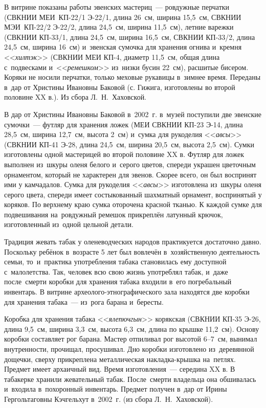 В витрине показаны работы эвенских мастериц~--- ровдужные перчатки (СВКНИИ МЕИ~КП-22/1 Э-22/1, длина 26~см, ширина 15,5~см, СВКНИИ МЭИ~КП-22/2 Э-22/2, длина 24,5~см, ширина 11,5~см), летние варежки (СВКНИИ КП-33/1, длина 24,5~см, ширина 16,5~см, СВКНИИ КП-33/2, длина 24,5~см, ширина 16~см) и~эвенская сумочка для хранения огнива и~кремня <<\textit{хилтэк}>> (СВКНИИ МЕИ КП-4, диаметр 11,5~см, общая длина с~подвесками и~<<\textit{ремешком}>> из~низки бусин 22~см), расшитые бисером. Коряки не носили перчатки, только меховые рукавицы в~зимнее время. Переданы в~дар от Христины Ивановны Баковой (с. Гижига, изготовлены во второй половине XX в.). Из сбора Л.~Н.~Хаховской.

В дар от Христины Ивановны Баковой в~2002~г. в~музей поступили две эвенские сумочки~--- футляр для хранения ложек (МЕИ СВКНИИ КП-23 Э-14, длина 28,5~см, ширина 12,7~см, высота 2~см) и~сумка для рукоделия <<\textit{авсы}>> (СВКНИИ КП-41 Э-28, длина 24,5~см, ширина 20,5~см, высота 2,5~см). Сумки изготовлены одной мастерицей во второй половине XX в. Футляр для ложек выполнен из~шкуры оленя белого и~серого цветов, спереди украшен цветочным орнаментом, который не характерен для эвенов. Скорее всего, он был воспринят ими у камчадалов. Сумка для рукоделия <<\textit{авсы}>> изготовлена из~шкуры оленя серого цвета, спереди имеет состыкованный шахматный орнамент, воспринятый у коряков. По верхнему краю сумка оторочена красной тканью. К каждой сумке для подвешивания на~ровдужный ремешок прикреплён латунный крючок, изготовленный из~одной цельной детали.

Традиция жевать табак у оленеводческих народов практикуется достаточно давно. Поскольку ребёнок в~возрасте 5 лет был вовлечён в~хозяйственную деятельность семьи, то~и~практика употребления табака становилась ему доступной с~малолетства. Так, человек всю свою жизнь употреблял табак, и~даже после~смерти коробки для хранения табака входили в~его погребальный инвентарь. В витрине археолого-этнографического зала находятся две коробки для хранения табака~--- из~рога барана и~бересты.

Коробка для хранения табака <<\textit{ялепючгын}>> корякская (СВКНИИ КП-35 Э-26, длина 9,5~см, ширина 3,3~см, высота 6,3~см, длина по крышке 11,2~см). Основу коробки составляет рог барана. Мастер отпиливал рог высотой 6--7~см, вынимал внутренности, прочищал, просушивал. Дно коробки изготовлено из~деревянной дощечки, сверху прикреплена металлическая накладка-крышка на~петлях. Предмет имеет архаичный вид. Время изготовления~--- середина XX в. В табакерке хранили жевательный табак. После~смерти владельца она обшивалась и~входила в~похоронный инвентарь. Предмет получен в~дар от Ирины Гергольтаговны Кэчгельхут в~2002~г. (из сбора Л.~Н.~Хаховской).

